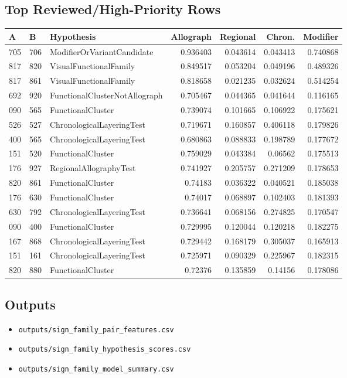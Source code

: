 ﻿\documentclass[11pt,a4paper]{article}
\begin{document}
\subsection*{Top Reviewed/High-Priority Rows}
\begin{center}
\begin{tabular}{lllrrrr}
\toprule
\textbf{A} & \textbf{B} & \textbf{Hypothesis} & \textbf{Allograph} & \textbf{Regional} & \textbf{Chron.} & \textbf{Modifier} \\
\midrule
705 & 706 & ModifierOrVariantCandidate & 0.936403 & 0.043614 & 0.043413 & 0.740868 \\
817 & 820 & VisualFunctionalFamily & 0.849517 & 0.053204 & 0.049196 & 0.489326 \\
817 & 861 & VisualFunctionalFamily & 0.818658 & 0.021235 & 0.032624 & 0.514254 \\
692 & 920 & FunctionalClusterNotAllograph & 0.705467 & 0.044365 & 0.041644 & 0.116165 \\
090 & 565 & FunctionalCluster & 0.739074 & 0.101665 & 0.106922 & 0.175621 \\
526 & 527 & ChronologicalLayeringTest & 0.719671 & 0.160857 & 0.406118 & 0.179826 \\
400 & 565 & ChronologicalLayeringTest & 0.680863 & 0.088833 & 0.198789 & 0.177672 \\
151 & 520 & FunctionalCluster & 0.759029 & 0.043384 & 0.06562 & 0.175513 \\
176 & 927 & RegionalAllographyTest & 0.741927 & 0.205757 & 0.271209 & 0.178653 \\
820 & 861 & FunctionalCluster & 0.74183 & 0.036322 & 0.040521 & 0.185038 \\
176 & 630 & FunctionalCluster & 0.74017 & 0.068897 & 0.102403 & 0.181393 \\
630 & 792 & ChronologicalLayeringTest & 0.736641 & 0.068156 & 0.274825 & 0.170547 \\
090 & 400 & FunctionalCluster & 0.729995 & 0.120044 & 0.120218 & 0.182275 \\
167 & 868 & ChronologicalLayeringTest & 0.729442 & 0.168179 & 0.305037 & 0.165913 \\
151 & 161 & ChronologicalLayeringTest & 0.725971 & 0.090329 & 0.225967 & 0.182315 \\
820 & 880 & FunctionalCluster & 0.72376 & 0.135859 & 0.14156 & 0.178086 \\
\bottomrule
\end{tabular}
\end{center}
\subsection*{Outputs}
\begin{itemize}
\item \texttt{outputs/sign\_family\_pair\_features.csv}
\item \texttt{outputs/sign\_family\_hypothesis\_scores.csv}
\item \texttt{outputs/sign\_family\_model\_summary.csv}
\end{itemize}
\end{document}
